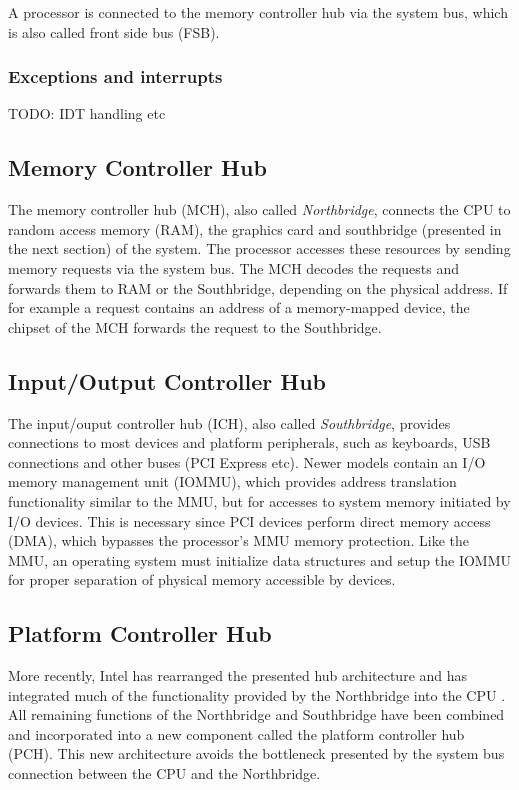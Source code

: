 A processor is connected to the memory controller hub via the system bus, which
is also called front side bus (FSB).

\subsubsection{Exceptions and interrupts}
TODO: IDT handling etc

\subsection{Memory Controller Hub}
The memory controller hub (MCH), also called
\emph{Northbridge}, connects the CPU to random access memory
(RAM), the graphics card and southbridge (presented in the next section) of the
system. The processor accesses these resources by sending memory requests via
the system bus. The MCH decodes the requests and forwards them to RAM or the
Southbridge, depending on the physical address. If for example a request
contains an address of a memory-mapped device, the chipset of the MCH forwards
the request to the Southbridge.

\subsection{Input/Output Controller Hub}\label{subsec:ich}
The input/ouput controller hub (ICH), also called
\emph{Southbridge}, provides connections to most devices and
platform peripherals, such as keyboards, USB connections and other buses (PCI
Express etc). Newer models contain an I/O memory management unit
(IOMMU), which provides address translation functionality similar
to the MMU, but for accesses to system memory initiated by I/O devices.  This is
necessary since PCI devices perform direct memory access (DMA), which
bypasses the processor's MMU memory protection.  Like the MMU, an operating
system must initialize data structures and setup the IOMMU for proper separation
of physical memory accessible by devices.

\subsection{Platform Controller Hub}
More recently, Intel has rearranged the presented hub architecture and has
integrated much of the functionality provided by the Northbridge into the CPU
\cite{IntelQPI}. All remaining functions of the Northbridge and Southbridge have
been combined and incorporated into a new component called the platform
controller hub (PCH). This new architecture avoids the bottleneck
presented by the system bus connection between the CPU and the Northbridge.

